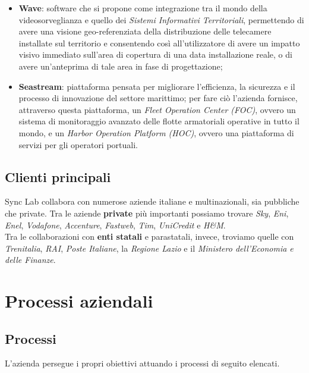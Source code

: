 \begin{itemize}
  \item \textbf{Wave}: software che si propone come integrazione tra il mondo della videosorveglianza e quello dei \textit{Sistemi Informativi Territoriali}, permettendo di avere una visione geo-referenziata della distribuzione delle telecamere installate sul territorio e consentendo così all'utilizzatore di avere un impatto visivo immediato sull'area di copertura di una data installazione reale, o di avere un'anteprima di tale area in fase di progettazione;

  \item \textbf{Seastream}: piattaforma pensata per migliorare l'efficienza, la sicurezza e il processo di innovazione del settore marittimo; per fare ciò l'azienda fornisce, attraverso questa piattaforma, un \textit{Fleet Operation Center (FOC)}, ovvero un sistema di monitoraggio avanzato delle flotte armatoriali operative in tutto il mondo, e un \textit{Harbor Operation Platform (HOC)}, ovvero una piattaforma di servizi per gli operatori portuali.
  \\

\end{itemize}

\subsection*{Clienti principali}
Sync Lab collabora con numerose aziende italiane e multinazionali, sia pubbliche che private. Tra le aziende \textbf{private} più importanti possiamo trovare \textit{Sky}, \textit{Eni}, \textit{Enel}, \textit{Vodafone}, \textit{Accenture}, \textit{Fastweb}, \textit{Tim}, \textit{UniCredit} e \textit{H\&M}. \\
Tra le collaborazioni con \textbf{enti statali} e parastatali, invece, troviamo quelle con \textit{Trenitalia}, \textit{RAI}, \textit{Poste Italiane}, la \textit{Regione Lazio} e il \textit{Ministero dell'Economia e delle Finanze}.

\section{Processi aziendali}

\subsection{Processi}

L'azienda persegue i propri obiettivi attuando i processi di seguito elencati.

